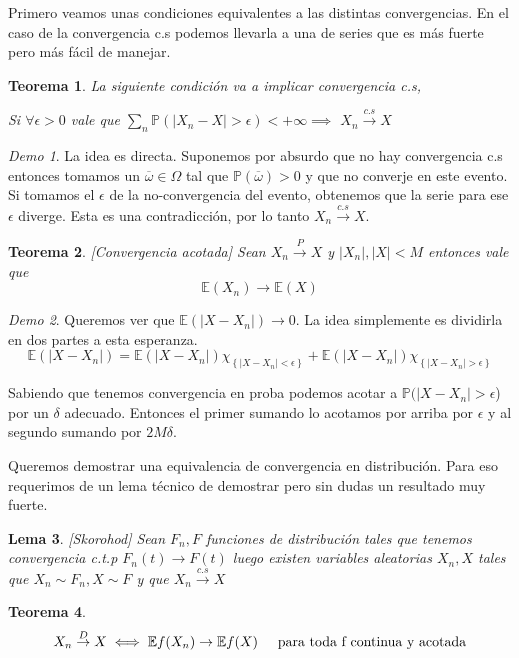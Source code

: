 \documentclass[11pt]{article}
\theoremstyle{plain} %
\newtheorem{teorema}{Teorema}
\newtheorem{lema}[teorema]{Lema}
\theoremstyle{definition}
\theoremstyle{remark}
\newtheorem*{demo}{Demo}
\def\Om{\Omega}
\def\E{\mathbb{E}}
\def\P{\mathbb{P}}
\def\vas{variables aleatorias }
\renewcommand\qed{\ding{110}}
\newcommand{\cs}{\overset{c.s}{\to}}
\newcommand{\proba}{\overset{P}{\to}}
\newcommand{\dist}{\overset{D}{\to}}
\begin{document}
Primero veamos unas condiciones equivalentes a las distintas convergencias. En el caso de la convergencia c.s podemos llevarla a una de series que es más fuerte pero más fácil de manejar.

\begin{teorema}
	\label{teo:seriecs}
	La siguiente condición va a implicar convergencia c.s,
	
		 Si $\forall \epsilon > 0$ vale que $\sum_{n} \P(|X_n - X|>\epsilon) < + \infty \implies$
		 $X_n \cs X$
\end{teorema}

\begin{demo}
	La idea es directa. Suponemos por absurdo que no hay convergencia c.s entonces tomamos un $\overline{\omega} \in \Om$ tal que $\P(\overline{\omega}) > 0$ y que no converje en este evento. Si tomamos el $\epsilon$ de la no-convergencia del evento, obtenemos que la serie para ese $\epsilon$ diverge. Esta es una contradicción, por lo tanto $X_n \cs X$.
	\qed
\end{demo}

\begin{teorema}
	\label{teo:convacot}
	[Convergencia acotada]
	Sean $X_n \proba X$ y $|X_n|,|X| < M$ entonces vale que
	\[ \E(X_n) \to \E(X) \]
\end{teorema}

\begin{demo}	
	Queremos ver que $\E(|X-X_n|) \to 0$. La idea simplemente es dividirla en dos partes a esta esperanza. 
	\[\E(|X-X_n|) = \E(|X-X_n|)\chi_{\left\lbrace |X-X_n|<\epsilon\right\rbrace } + \E(|X-X_n|)\chi_{\left\lbrace |X-X_n|>\epsilon\right\rbrace }\]
	
	Sabiendo que tenemos convergencia en proba podemos acotar a $\P(|X-X_n|>\epsilon$) por un $\delta$ adecuado. Entonces el primer sumando lo acotamos por arriba por $\epsilon$ y al segundo sumando por  $2M\delta$. \qed
\end{demo}

Queremos demostrar una equivalencia de convergencia en distribución. Para eso requerimos de un lema técnico de demostrar pero sin dudas un resultado muy fuerte.

\begin{lema}
	\label{teo:sko}
	[Skorohod]
	Sean $F_n, F$ funciones de distribución tales que tenemos convergencia c.t.p $F_n(t) \to F(t)$
	luego existen \vas $X_n, X$ tales que $X_n \sim F_n, X \sim F$ y que $X_n \cs X$
\end{lema}

 
\begin{teorema}
	\label{teo:convdist}
	\[ X_n \dist X \iff \E f(X_n) \to \E f(X) \hskip0.5cm \text{para toda f continua y acotada}  \]
\end{teorema}
\end{document}
